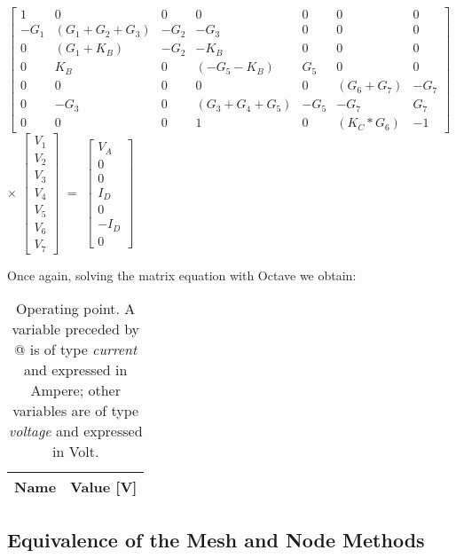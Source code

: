 $
\begin{bmatrix}
	1 & 0 & 0 & 0 & 0 & 0 & 0 \\
	-G_1 & (G_1 + G_2+G_3) & -G_2 & -G_3 & 0 & 0 & 0 \\
	0 & (G_1 + K_B) & -G_2 & -K_B & 0 & 0 & 0 \\
	0 & K_B & 0 & (-G_5 - K_B) & G_5 & 0 & 0 \\
	0 & 0 & 0 & 0 & 0 & (G_6 + G_7) & -G_7 \\
	0 & -G_3 & 0 & (G_3 + G_4 + G_5) & -G_5 & -G_7 & G_7 \\
	0 & 0 & 0 & 1 & 0 & (K_C * G_6) & -1
\end{bmatrix}
$
$\times$
$
\begin{bmatrix}
	V_1 \\
	V_2 \\
	V_3 \\
	V_4 \\
	V_5 \\
	V_6 \\
	V_7
\end{bmatrix}
$
$=$
$
\begin{bmatrix}
	V_A \\
	0 \\
	0 \\
	I_D \\
	0 \\
	-I_D \\
	0
	\label{m:2}
\end{bmatrix}
$


Once again, solving the matrix equation with Octave we obtain:

\begin{table}[h]
  \centering
  \begin{tabular}{|l|r|}
    \hline    
    {\bf Name} & {\bf Value [V]} \\ \hline
    
  \end{tabular}
  \caption{Operating point. A variable preceded by @ is of type {\em current}
    and expressed in Ampere; other variables are of type {\it voltage} and expressed in
    Volt.}
  \label{tab:op}
\end{table}

\subsection{Equivalence of the Mesh and Node Methods}



